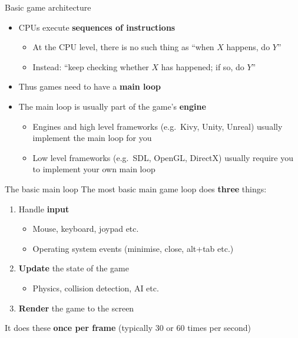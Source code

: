 
\begin{frame}{Basic game architecture}
    \begin{itemize}
        \item CPUs execute \textbf{sequences of instructions}
            \begin{itemize}
                \item At the CPU level, there is no such thing as ``when $X$ happens, do $Y$''
                \item Instead: ``keep checking whether $X$ has happened; if so, do $Y$''
            \end{itemize}
        \item Thus games need to have a \textbf{main loop}
        \item The main loop is usually part of the game's \textbf{engine}
            \begin{itemize}
                \item Engines and high level frameworks (e.g.\ Kivy, Unity, Unreal)
                    usually implement the main loop for you
                \item Low level frameworks (e.g.\ SDL, OpenGL, DirectX)
                    usually require you to implement your own main loop
            \end{itemize}
    \end{itemize}
\end{frame}

\begin{frame}{The basic main loop}
    The most basic main game loop does \textbf{three} things:
    \begin{enumerate}
        \item Handle \textbf{input}
            \begin{itemize}
                \item Mouse, keyboard, joypad etc.
                \item Operating system events (minimise, close, alt+tab etc.)
            \end{itemize}
        \item \textbf{Update} the state of the game
            \begin{itemize}
                \item Physics, collision detection, AI etc.
            \end{itemize}
        \item \textbf{Render} the game to the screen
    \end{enumerate}
    It does these \textbf{once per frame} (typically 30 or 60 times per second)
\end{frame}

